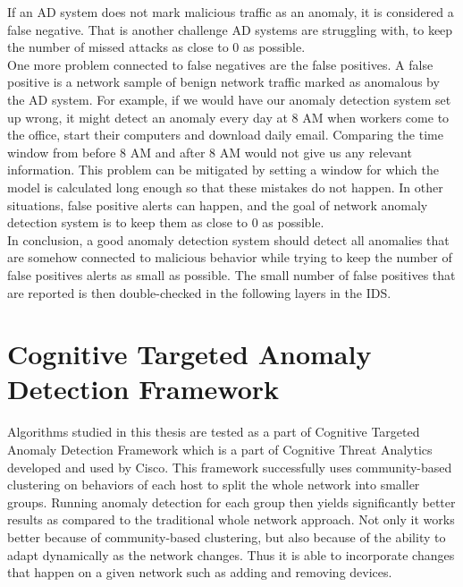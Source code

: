 \documentclass[thesis=B,english]{FITthesis}[2012/10/20]
\begin{document}
If an AD system does not mark malicious traffic as an anomaly, it is considered a false negative.
That is another challenge AD systems are struggling with, to keep the number of missed attacks as close to 0 as possible. \\

One more problem connected to false negatives are the false positives.
A false positive is a network sample of benign network traffic marked as anomalous by the AD system.
For example, if we would have our anomaly detection system set up wrong, it might detect an anomaly every day at 8 AM when workers come to the office, start their computers and download daily email.
Comparing the time window from before 8 AM and after 8 AM would not give us any relevant information.
This problem can be mitigated by setting a window for which the model is calculated long enough so that these mistakes do not happen.
In other situations, false positive alerts can happen, and the goal of network anomaly detection system is to keep them as close to 0 as possible. \\

In conclusion, a good anomaly detection system should detect all anomalies that are somehow connected to malicious behavior while trying to keep the number of false positives alerts as small as possible.
The small number of false positives that are reported is then double-checked in the following layers in the IDS.
                                                                                  
\section{Cognitive Targeted Anomaly Detection Framework}                          
                                             
Algorithms studied in this thesis are tested as a part of Cognitive Targeted Anomaly Detection Framework which is a part of Cognitive Threat Analytics developed and used by Cisco.
This framework successfully uses community-based clustering on behaviors of each host to split the whole network into smaller groups.
Running anomaly detection for each group then yields significantly better results as compared to the traditional whole network approach.
Not only it works better because of community-based clustering, but also because of the ability to adapt dynamically as the network changes.
Thus it is able to incorporate changes that happen on a given network such as adding and removing devices.\\
                                                                                  
\end{document}
